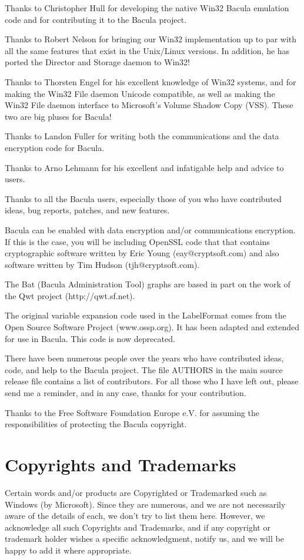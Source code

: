 Thanks to Christopher Hull for developing the native Win32 Bacula emulation
code and for contributing it to the Bacula project. 

Thanks to Robert Nelson for bringing our Win32 implementation up to par
with all the same features that exist in the Unix/Linux versions.  In
addition, he has ported the Director and Storage daemon to Win32!

Thanks to Thorsten Engel for his excellent knowledge of Win32 systems, and
for making the Win32 File daemon Unicode compatible, as well as making
the Win32 File daemon interface to Microsoft's Volume Shadow Copy (VSS).
These two are big pluses for Bacula!

Thanks to Landon Fuller for writing both the communications and the
data encryption code for Bacula.

Thanks to Arno Lehmann for his excellent and infatigable help and advice
to users.

Thanks to all the Bacula users, especially those of you who have contributed
ideas, bug reports, patches, and new features. 

Bacula can be enabled with data encryption and/or communications
encryption. If this is the case, you will be including OpenSSL code that
that contains cryptographic software written by Eric Young
(eay@cryptsoft.com) and also software written by Tim Hudson
(tjh@cryptsoft.com).

The Bat (Bacula Administration Tool) graphs are based in part on the work
of the Qwt project (http://qwt.sf.net).

The original variable expansion code used in the LabelFormat comes from the
Open Source Software Project (www.ossp.org). It has been adapted and extended
for use in Bacula. This code is now deprecated.

There have been numerous people over the years who have contributed ideas,
code, and help to the Bacula project.  The file AUTHORS in the main source
release file contains a list of contributors.  For all those who I have
left out, please send me a reminder, and in any case, thanks for your
contribution.

Thanks to the Free Software Foundation Europe e.V. for assuming the 
responsibilities of protecting the Bacula copyright.

\section*{Copyrights and Trademarks}

Certain words and/or products are Copyrighted or Trademarked such as Windows
(by Microsoft). Since they are numerous, and we are not necessarily aware of
the details of each, we don't try to list them here. However, we acknowledge
all such Copyrights and Trademarks, and if any copyright or trademark holder
wishes a specific acknowledgment, notify us, and we will be happy to add it
where appropriate. 
